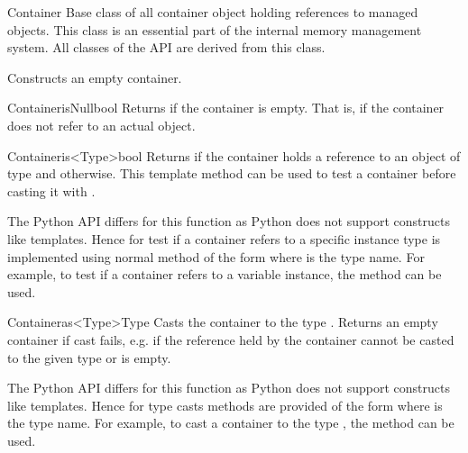 \begin{defclass}{Container}
Base class of all container object holding references to managed objects. This class is an essential part of the internal memory 
management system. All classes of the API are derived from this class.

\begin{classsyn}{}
Constructs an empty container.
\end{classsyn}

\begin{defmeth}{Container}{isNull}{bool}{}
Returns  if the container is empty. That is, if the container does not refer to an actual object.
\end{defmeth}

\begin{defmeth}{Container}{is<Type>}{bool}{}
Returns  if the container holds a reference to an object of type  and  otherwise. 
This template method can be used to test a container before casting it with .

The Python API differs for this function as Python does not support constructs like templates. Hence for test if a container
refers to a specific instance type is implemented using normal method of the form  where  is the 
type name. For example, to test if a container refers to a variable instance, the method  can be used.
\end{defmeth}

\begin{defmeth}{Container}{as<Type>}{Type}{}
Casts the container to the type . Returns an empty container if cast fails, e.g. if the reference held by the 
container cannot be casted to the given type or is empty.

The Python API differs for this function as Python does not support constructs like templates. Hence for type casts 
methods are provided of the form  where  is the type name. For example, to cast a container to the type , the method  can be used.
\end{defmeth}
\end{defclass}


